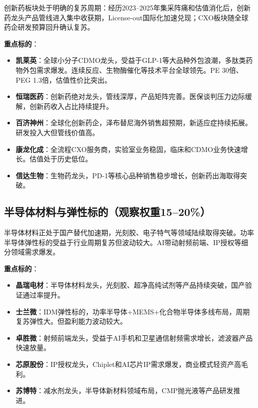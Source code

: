 创新药板块处于明确的复苏周期：经历2023--2025年集采阵痛和估值消化后，创新药龙头产品管线进入集中收获期，License-out国际化加速兑现；CXO板块随全球药企研发预算回升确认复苏。

\textbf{重点标的}：
\vspace{0.2em}
\begin{itemize}[leftmargin=2em]
\item \textbf{凯莱英}：全球小分子CDMO龙头，受益于GLP-1等大品种外包浪潮，多肽类药物外包需求爆发。连续反应、生物酶催化等技术平台全球领先。PE 30倍、PEG 1.3倍，估值性价比突出。
\item \textbf{恒瑞医药}：创新药绝对龙头，管线深厚，产品矩阵完善。医保谈判压力边际缓解，创新药收入占比持续提升。
\item \textbf{百济神州}：全球化创新药企，泽布替尼海外销售超预期，新适应症持续拓展。研发投入大但管线价值高。
\item \textbf{康龙化成}：全流程CXO服务商，实验室业务稳固，临床和CDMO业务快速增长。估值处于历史低位。
\item \textbf{信达生物}：生物药龙头，PD-1等核心品种销售稳步增长，创新药出海取得突破。
\end{itemize}

\subsection{半导体材料与弹性标的（观察权重15--20\%）}

半导体材料正处于国产替代加速期，光刻胶、电子特气等领域陆续取得突破。功率半导体弹性标的受益于行业周期复苏但波动较大。AI带动射频前端、IP授权等细分领域需求爆发。

\textbf{重点标的}：
\vspace{0.2em}
\begin{itemize}[leftmargin=2em]
\item \textbf{晶瑞电材}：半导体材料龙头，光刻胶、超净高纯试剂等产品持续突破，国产验证通过率提升。
\item \textbf{士兰微}：IDM弹性标的，功率半导体+MEMS+化合物半导体多线布局，周期复苏弹性大。但盈利能力波动较大。
\item \textbf{卓胜微}：射频前端龙头，受益于AI手机和卫星通信射频需求增长，滤波器产品快速放量。
\item \textbf{芯原股份}：IP授权龙头，Chiplet和AI芯片IP需求爆发，商业模式轻资产高毛利。
\item \textbf{苏博特}：减水剂龙头，半导体新材料领域布局，CMP抛光液等产品研发推进。
\end{itemize}

